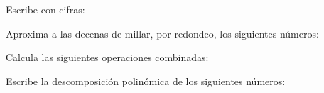 \documentclass[spanish, 11pt]{exam}
\begin{document}
\begin{questions}

\question[0\half] Escribe con cifras:

\question[0\half] Aproxima a las decenas de millar, por redondeo, los siguientes números: 
\begin{multicols}{2}
\end{multicols}

\question[1\half] Calcula las siguientes operaciones combinadas:




\question[1\half]  Escribe la descomposición polinómica de los siguientes números:


\end{questions}
\end{document}
